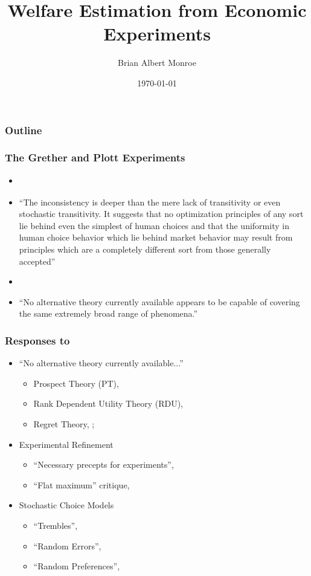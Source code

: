 \documentclass{beamer}
\title{Welfare Estimation from Economic Experiments}
\author{Brian Albert Monroe}
\date{\today}
\begin{document}
\begin{frame}
	\titlepage
\end{frame}

\begin{frame}
\frametitle{Outline}
\tableofcontents
\end{frame}

\begin{frame}
\frametitle{The Grether and Plott Experiments}
\begin{itemize}
	\item \textcite[624]{Grether1979}
	\item \enquote{The inconsistency is deeper than the mere lack of transitivity or even stochastic transitivity. It suggests that no optimization principles of any sort lie behind even the simplest of human choices and that the uniformity in human choice behavior which lie behind market behavior may result from principles which are a completely different sort from those generally accepted}
	\item \textcite[634]{Grether1979}
	\item \enquote{No alternative theory currently available appears to be capable of covering the same extremely broad range of phenomena.}
\end{itemize}
\end{frame}

\begin{frame}
\frametitle{Responses to \textcite{Grether1979}}
\begin{itemize}
	\item \enquote{No alternative theory currently available...}
		\begin{itemize}
			\item Prospect Theory (PT), \textcite{Kahneman1979}
			\item Rank Dependent Utility Theory (RDU), \textcite{Quiggin1982}
			\item Regret Theory, \textcite{Bell1982}; \textcite{Loomes1982}
		\end{itemize}
	\item Experimental Refinement
		\begin{itemize}
			\item \enquote{Necessary precepts for experiments}, \textcite{Smith1982}
			\item \enquote{Flat maximum} critique, \textcite{Harrison1989, Harrison1992}
		\end{itemize}
	\item Stochastic Choice Models
		\begin{itemize}
			\item \enquote{Trembles}, \textcite{Harless1994}
			\item \enquote{Random Errors}, \textcite{Hey1994}
			\item \enquote{Random Preferences}, \textcite{Loomes1995}
		\end{itemize}
\end{itemize}
\end{frame}
\end{document}
